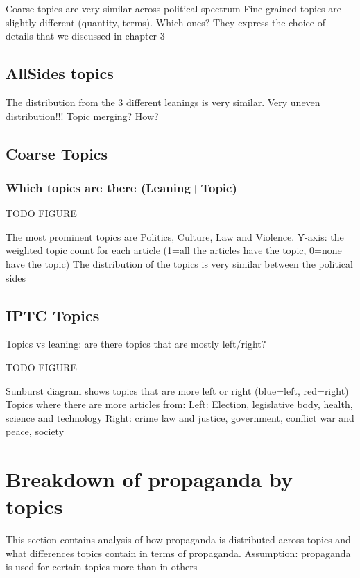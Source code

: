 Coarse topics are very similar across political spectrum
Fine-grained topics are slightly different (quantity, terms). Which ones? They express the choice of details that we discussed in chapter 3


\subsection{AllSides topics}

The distribution from the 3 different leanings is very similar. 
Very uneven distribution!!!
Topic merging? How?

\subsection{Coarse Topics}

\subsubsection{Which topics are there (Leaning+Topic)}

TODO FIGURE

The most prominent topics are Politics, Culture, Law and Violence.
Y-axis: the weighted topic count for each article (1=all the articles have the topic, 0=none have the topic)
The distribution of the topics is very similar between the political sides

\subsection{IPTC Topics}
Topics vs leaning: are there topics that are mostly left/right?

TODO FIGURE

Sunburst diagram shows topics that are more left or right (blue=left, red=right)
Topics where there are more articles from:
Left: Election, legislative body, health, science and technology
Right: crime law and justice, government, conflict war and peace, society


\section{Breakdown of propaganda by topics}
\label{sec:topic_propaganda}

This section contains analysis of how propaganda is distributed across topics and what differences topics contain in terms of propaganda.
Assumption: propaganda is used for certain topics more than in others

